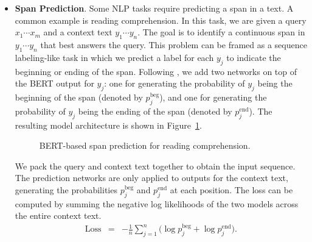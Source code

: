 \begin{itemize}
    \noindent  In this model, we use the BIO tagging scheme to represent named entities. For example, $\mathrm{B}\textrm{-}\mathrm{ORG}$ means the beginning of an organization, $\mathrm{I}\textrm{-}\mathrm{ORG}$ means the word is inside an organization, and $\mathrm{O}$ means the word does not belong to any named entity. This NER model can output a distribution over the tag set at each position, denoted as $\mathbf{p}_i$. The training or fine-tuning of the model can be performed over these distributions $\{\mathbf{p}_1,\cdots,\mathbf{p}_m\}$. For example, suppose $p_i(\mathrm{tag}_i)$ is the probability of the correct tag at position $i$. The training loss can be defined to be the negative log-likelihood
    \begin{eqnarray}
    \mathrm{Loss} & = & -\frac{1}{m} \sum_{i=1}^{m} \log p_i(\mathrm{tag}_i).
    \end{eqnarray}

    Finding the best label sequence given a trained NER model is a well-studied problem in NLP. This is often achieved via dynamic programming, which, in the context of path finding over a lattice, has linear complexity~\cite{huang-etal:2009dynamic}.

\item \vspace{0.3em} \textbf{Span Prediction}. Some NLP tasks require predicting a span in a text. A common example is reading comprehension. In this task, we are given a query $x_1 \cdots x_m$ and a context text $y_1 \cdots y_n$. The goal is to identify a continuous span in $y_1 \cdots y_n$ that best answers the query. This problem can be framed as a sequence labeling-like task in which we predict a label for each $y_j$ to indicate the beginning or ending of the span. Following \citet{seo-etal:2017bidirectional}, we add two networks on top of the BERT output for $y_j$: one for generating the probability of $y_j$ being the beginning of the span (denoted by $p_j^{\mathrm{beg}}$), and one for generating the probability of $y_j$ being the ending of the span (denoted by $p_j^{\mathrm{end}}$). The resulting model architecture is shown in Figure~\ref{fig:bert-app-span-prediction}.

\begin{figure}[!ht]
\centering

\caption{BERT-based span prediction for reading comprehension.}
\label{fig:bert-app-span-prediction}
\end{figure}

    We pack the query and context text together to obtain the input sequence. The prediction networks are only applied to outputs for the context text, generating the probabilities $p_j^{\mathrm{beg}}$ and $p_j^{\mathrm{end}}$ at each position. The loss can be computed by summing the negative log likelihoods of the two models across the entire context text.
    \begin{eqnarray}
    \mathrm{Loss} & = & - \frac{1}{n} \sum_{j=1}^{n} \big( \log p_j^{\mathrm{beg}} + \log p_j^{\mathrm{end}} \big).
    \end{eqnarray}


\end{itemize}
